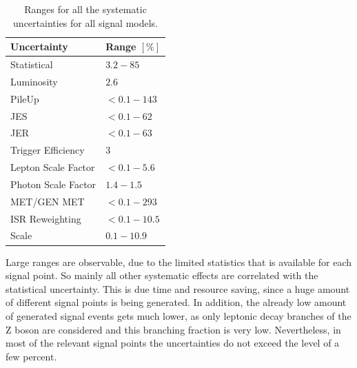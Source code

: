 \begin{table}[tbp]
 \centering
 \caption{Ranges for all the systematic uncertainties for all signal models.}
 \normalsize
 \label{tab:systuncSignal}
 \begin{tabular}[width=\textwidth]{ll}
  Uncertainty         & Range $[\%]$ \\\hline
  Statistical         & $3.2-85$     \\
  Luminosity          & $2.6$        \\
  PileUp              & $<0.1-143$   \\
  JES                 & $<0.1-62$    \\
  JER                 & $<0.1-63$    \\
  Trigger Efficiency  & $3$          \\
  Lepton Scale Factor & $<0.1-5.6$   \\
  Photon Scale Factor & $1.4-1.5$    \\
  MET/GEN MET         & $<0.1-293$   \\
  ISR Reweighting     & $<0.1-10.5$  \\
  Scale               & $0.1-10.9$   \\
  \hline
 \end{tabular}
\end{table}
Large ranges are observable, due to the limited statistics that is available for each signal point. So mainly all other systematic effects are correlated with the statistical uncertainty. This is due time and resource saving, since a huge amount of different signal points is being generated. In addition, the already low amount of generated signal events gets much lower, as only leptonic decay branches of the Z boson are considered and this branching fraction is very low. Nevertheless, in most of the relevant signal points the uncertainties do not exceed the level of a few percent.
